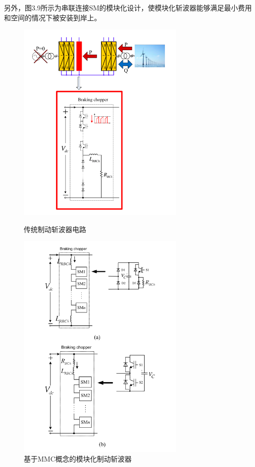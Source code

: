   另外，图3.9所示为串联连接SM的模块化设计，使模块化斩波器能够满足最小费用和空间的情况下被安装到岸上。
\begin{figure}[H]
\begin{minipage}[t]{0.5\linewidth}
\centering
\includegraphics[width=3.2in]{images/Paper_Fig_9.png}
\setcaptionwidth{2.5in}
\caption{传统制动斩波器电路}
\end{minipage}%
\begin{minipage}[t]{0.5\linewidth}
\centering
\includegraphics[width=3.2in]{images/Paper_Fig_10.png}
\setcaptionwidth{2.5in}
\caption{基于MMC概念的模块化制动斩波器}
\end{minipage}
\end{figure} 

